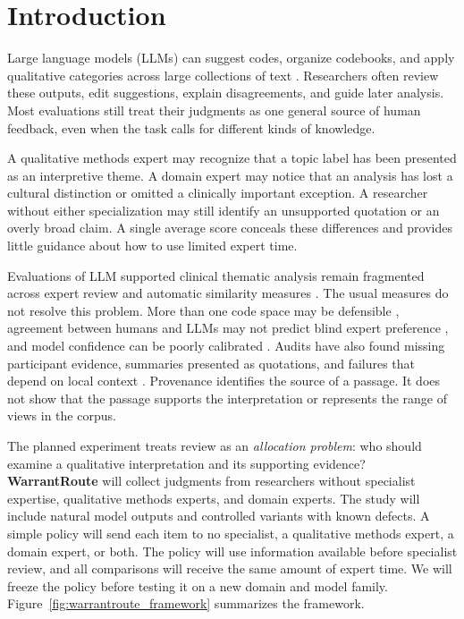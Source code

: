 
\section{Introduction}

Large language models (LLMs) can suggest codes, organize codebooks, and apply qualitative categories across large collections of text \citep{dai2023llm,wang2026centaurta,matveyenko2026muse}. Researchers often review these outputs, edit suggestions, explain disagreements, and guide later analysis. Most evaluations still treat their judgments as one general source of human feedback, even when the task calls for different kinds of knowledge.

A qualitative methods expert may recognize that a topic label has been presented as an interpretive theme. A domain expert may notice that an analysis has lost a cultural distinction or omitted a clinically important exception. A researcher without either specialization may still identify an unsupported quotation or an overly broad claim. A single average score conceals these differences and provides little guidance about how to use limited expert time.

Evaluations of LLM supported clinical thematic analysis remain fragmented across expert review and automatic similarity measures \citep{yi2025position}. The usual measures do not resolve this problem. More than one code space may be defensible \citep{chen2026opencodes}, agreement between humans and LLMs may not predict blind expert preference \citep{liu2026agreement}, and model confidence can be poorly calibrated \citep{li2026confidence}. Audits have also found missing participant evidence, summaries presented as quotations, and failures that depend on local context \citep{parkington2025human,bang2026hybrid,subbiah2026story}. Provenance identifies the source of a passage. It does not show that the passage supports the interpretation or represents the range of views in the corpus.

The planned experiment treats review as an \emph{allocation problem}: who should examine a qualitative interpretation and its supporting evidence? \textbf{WarrantRoute} will collect judgments from researchers without specialist expertise, qualitative methods experts, and domain experts. The study will include natural model outputs and controlled variants with known defects. A simple policy will send each item to no specialist, a qualitative methods expert, a domain expert, or both. The policy will use information available before specialist review, and all comparisons will receive the same amount of expert time. We will freeze the policy before testing it on a new domain and model family. Figure~\ref{fig:warrantroute_framework} summarizes the framework.

